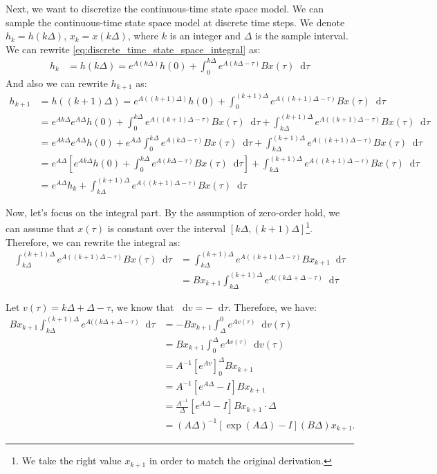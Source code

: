 \documentclass[a4paper]{article}
\newcommand*{\dif}{\mathop{}\!\mathrm{d}}
\begin{document}
Next, we want to discretize the continuous-time state space model. We can sample the continuous-time state space model at discrete time steps. We denote $h_k = h(k\Delta)$, $x_k = x(k\Delta)$, where $k$ is an integer and $\Delta$ is the sample interval. We can rewrite \autoref{eq:discrete_time_state_space_integral} as:
\begin{align}
    h_k &= h(k\Delta) = e^{A(k\Delta)} h(0) + \int_0^{k\Delta} e^{A(k\Delta-\tau)} B x(\tau) \dif \tau
\end{align}
And also we can rewrite $h_{k+1}$ as:
\begin{align}
    h_{k+1} &= h((k+1)\Delta) = e^{A((k+1)\Delta)} h(0) + \int_0^{(k+1)\Delta} e^{A((k+1)\Delta-\tau)} B x(\tau) \dif \tau \\ 
    &= e^{Ak\Delta} e^{A\Delta} h(0) + \int_0^{k\Delta} e^{A((k+1)\Delta-\tau)} B x(\tau) \dif \tau + \int_{k\Delta}^{(k+1)\Delta} e^{A((k+1)\Delta-\tau)} B x(\tau) \dif \tau  \\
    &= e^{Ak\Delta} e^{A\Delta} h(0) + e^{A\Delta} \int_0^{k\Delta} e^{A(k\Delta-\tau)} B x(\tau) \dif \tau + \int_{k\Delta}^{(k+1)\Delta} e^{A((k+1)\Delta-\tau)} B x(\tau) \dif \tau  \\
    &= e^{A\Delta} \left[e^{Ak\Delta} h(0) + \int_0^{k\Delta} e^{A(k\Delta-\tau)} B x(\tau) \dif \tau\right] + \int_{k\Delta}^{(k+1)\Delta} e^{A((k+1)\Delta-\tau)} B x(\tau) \dif \tau  \\
    &= e^{A\Delta} h_k + \int_{k\Delta}^{(k+1)\Delta} e^{A((k+1)\Delta-\tau)} B x(\tau) \dif \tau \label{eq:discrete_time_state_space_integral_k}
\end{align}

Now, let's focus on the integral part. By the assumption of zero-order hold, we can assume that $x(\tau)$ is constant over the interval $[k\Delta, (k+1)\Delta]$\footnote{We take the right value $x_{k+1}$ in order to match the original derivation.}. Therefore, we can rewrite the integral as:
\begin{align}
    \int_{k\Delta}^{(k+1)\Delta} e^{A((k+1)\Delta-\tau)} B x(\tau) \dif \tau &= \int_{k\Delta}^{(k+1)\Delta} e^{A((k+1)\Delta-\tau)} B x_{k+1} \dif \tau \\
    &= B x_{k+1} \int_{k\Delta}^{(k+1)\Delta} e^{A((k\Delta+\Delta-\tau)} \dif \tau
\end{align}

Let $v(\tau) = k\Delta + \Delta - \tau$, we know that $\dif v = - \dif \tau$. Therefore, we have:
\begin{align}
    B x_{k+1} \int_{k\Delta}^{(k+1)\Delta} e^{A((k\Delta+\Delta-\tau)} \dif \tau &= - B x_{k+1} \int_{\Delta}^{0} e^{A v(\tau)} \dif v(\tau) \\
    &= B x_{k+1} \int_{0}^{\Delta} e^{A v(\tau)} \dif v(\tau) \\
    &= A^{-1} \left[e^{A v}\right]_{0}^{\Delta} B x_{k+1} \\
    &= A^{-1} \left[e^{A \Delta} - I\right] B x_{k+1} \\
    &= \frac{A^{-1}}{\Delta} \left[e^{A \Delta} - I\right] B x_{k+1} \cdot \Delta \\
    &= (A\Delta)^{-1} \left[\exp(A \Delta) - I\right] (B\Delta) x_{k+1}. 
\end{align}
\end{document}
